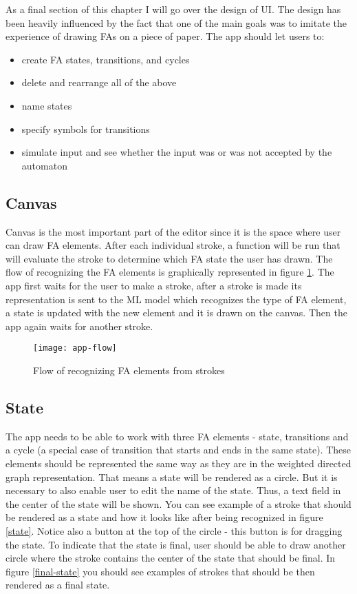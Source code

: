 As a final section of this chapter I will go over the design of UI. The design has been heavily influenced by the fact that one of the main goals was to imitate the experience of drawing FAs on a piece of paper. The app should let users to:
\begin{itemize}
    \item create FA states, transitions, and cycles
    \item delete and rearrange all of the above
    \item name states
    \item specify symbols for transitions
    \item simulate input and see whether the input was or was not accepted by the automaton
\end{itemize}

\subsection{Canvas}

Canvas is the most important part of the editor since it is the space where user can draw FA elements. After each individual stroke, a function will be run that will evaluate the stroke to determine which FA state the user has drawn. The flow of recognizing the FA elements is graphically represented in figure \ref{app-flow}. The app first waits for the user to make a stroke, after a stroke is made its representation is sent to the ML model which recognizes the type of FA element, a state is updated with the new element and it is drawn on the canvas. Then the app again waits for another stroke.

\begin{figure}
    \texttt{[image: app-flow]}
    \caption{Flow of recognizing FA elements from strokes}\label{app-flow}
\end{figure}

\subsection{State}

The app needs to be able to work with three FA elements - state, transitions and a cycle (a special case of transition that starts and ends in the same state). These elements should be represented the same way as they are in the weighted directed graph representation. That means a state will be rendered as a circle. But it is necessary to also enable user to edit the name of the state. Thus, a text field in the center of the state will be shown. You can see example of a stroke that should be rendered as a state and how it looks like after being recognized in figure \ref{state}. Notice also a button at the top of the circle - this button is for dragging the state. To indicate that the state is final, user should be able to draw another circle where the stroke contains the center of the state that should be final. In figure \ref{final-state} you should see examples of strokes that should be then rendered as a final state.

